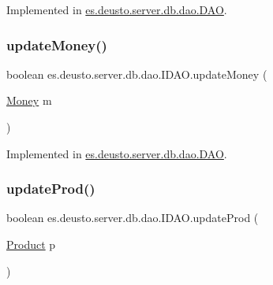 Implemented in \hyperlink{classes_1_1deusto_1_1server_1_1db_1_1dao_1_1_d_a_o_acb146e96959c340ef828ef8e36b4283c}{es.\+deusto.\+server.\+db.\+dao.\+D\+AO}.

\mbox{\label{interfacees_1_1deusto_1_1server_1_1db_1_1dao_1_1_i_d_a_o_a2a4641aeefc28dc979e0146e8ca73342}} 
\subsubsection{\texorpdfstring{update\+Money()}{updateMoney()}}
{\footnotesize\ttfamily boolean es.\+deusto.\+server.\+db.\+dao.\+I\+D\+A\+O.\+update\+Money (\begin{DoxyParamCaption}\item[{\hyperlink{classes_1_1deusto_1_1server_1_1db_1_1data_1_1_money}{Money}}]{m }\end{DoxyParamCaption})}



Implemented in \hyperlink{classes_1_1deusto_1_1server_1_1db_1_1dao_1_1_d_a_o_a05c7fc41d49e5ab7f0830405ccf60c87}{es.\+deusto.\+server.\+db.\+dao.\+D\+AO}.

\mbox{\label{interfacees_1_1deusto_1_1server_1_1db_1_1dao_1_1_i_d_a_o_afc4634e403796a1b66fc5251b5b86d1e}} 
\subsubsection{\texorpdfstring{update\+Prod()}{updateProd()}}
{\footnotesize\ttfamily boolean es.\+deusto.\+server.\+db.\+dao.\+I\+D\+A\+O.\+update\+Prod (\begin{DoxyParamCaption}\item[{\hyperlink{classes_1_1deusto_1_1server_1_1db_1_1data_1_1_product}{Product}}]{p }\end{DoxyParamCaption})}



